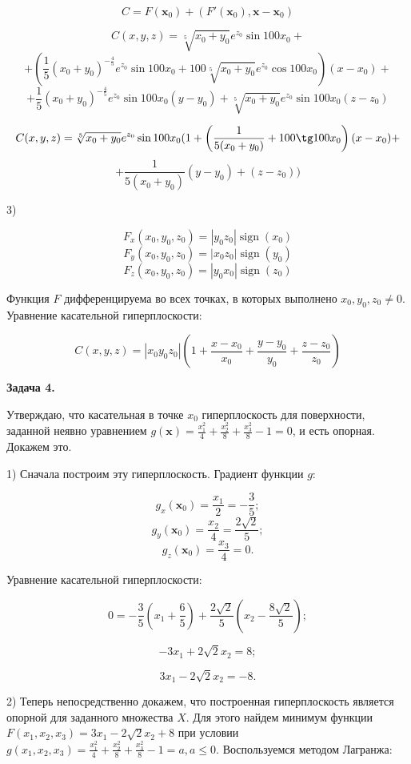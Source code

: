 \documentclass[12pt]{article}
\DeclareMathOperator*{\sign}{sign}
\begin{document}
$$C = F(\textbf{x}_0) + (F'(\textbf{x}_0), \textbf{x} - \textbf{x}_0) $$

$$C(x, y, z) = \sqrt[5]{x_0+y_0}e^{z_0} \sin 100x_0+$$
$$ + \left(\frac{1}{5}(x_0+y_0)^{-\frac{4}{5}}e^{z_0} \sin 100x_0 + 100\sqrt[5]{x_0+y_0}e^{z_0} \cos 100x_0\right)(x - x_0)+$$ 
$$+ \frac{1}{5}(x_0+y_0)^{-\frac{4}{5}}e^{z_0} \sin 100x_0(y-y_0) + \sqrt[5]{x_0+y_0}e^{z_0} \sin 100x_0(z-z_0)$$

$$C(x, y, z) = \sqrt[5]{x_0+y_0}e^{z_0} \sin 100x_0 (1 + \left(\frac{1}{5(x_0+y_0)} + 100\tg 100x_0\right)(x - x_0)+$$
$$ + \frac{1}{5(x_0+y_0)}(y-y_0) + (z-z_0))$$

3)

$$F_x(x_0, y_0, z_0) = |y_0z_0|\sign(x_0)$$
$$F_y(x_0, y_0, z_0) = |x_0z_0|\sign(y_0)$$
$$F_z(x_0, y_0, z_0) = |y_0x_0|\sign(z_0)$$

Функция $F$ дифференцируема во всех точках, в которых выполнено $x_0, y_0, z_0 \neq 0$. Уравнение касательной гиперплоскости:

$$C(x, y, z) = |x_0y_0z_0|\left(1 + \frac{x - x_0}{x_0}+ \frac{y - y_0}{y_0}+ \frac{z - z_0}{z_0}\right)$$

\begin{center}
	\textbf{Задача 4.}
\end{center}

Утверждаю, что касательная  в точке $x_0$ гиперплоскость для поверхности, заданной неявно уравнением $g(\textbf{x})=\frac{x_1^2}{4}+\frac{x_2^2}{8}+\frac{x_3^2}{8} - 1 = 0$, и есть опорная. Докажем это.

1) Сначала построим эту гиперплоскость. Градиент функции $g$:

$$g_x(\textbf{x}_0) = \frac{x_1}{2} = -\frac{3}{5};$$
$$g_y(\textbf{x}_0) = \frac{x_2}{4} = \frac{2\sqrt{2}}{5};$$
$$g_z(\textbf{x}_0) = \frac{x_3}{4} = 0.$$

Уравнение касательной гиперплоскости:

$$0 = -\frac{3}{5}\left(x_1 + \frac{6}{5}\right) + \frac{2\sqrt{2}}{5}\left(x_2 - \frac{8\sqrt{2}}{5}\right);$$

$$-3x_1 + 2\sqrt{2}x_2 = 8;$$

$$3x_1 - 2\sqrt{2}x_2 = -8.$$

2) Теперь непосредственно докажем, что построенная гиперплоскость является опорной для заданного множества $X$. Для этого найдем минимум функции $F(x_1, x_2, x_3) = 3x_1 - 2\sqrt{2}x_2  + 8$ при условии $g(x_1, x_2, x_3) = \frac{x_1^2}{4}+\frac{x_2^2}{8}+\frac{x_3^2}{8} - 1 = a, a \leq 0$. Воспользуемся методом Лагранжа:
\end{document}
